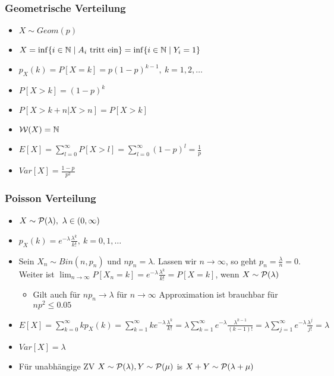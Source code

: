 \subsubsection{Geometrische Verteilung}
\begin{itemize}
    \item $X \sim Geom(p)$
    \item $X = \inf \{i \in \mathbb{N} \mid A_i \text{ tritt ein}\} = \inf \{i \in \mathbb{N} \mid Y_i = 1\}$
    \item $p_X(k) = P[X = k] = p(1 - p)^{k - 1}, \ k = 1, 2, \dots$
    \item $P[X > k] = (1 - p)^k$
    \item $P[X > k + n | X > n] = P[X > k]$
    \item $\mathcal{W}(X) = \mathbb{N}$
    \item $E[X] = \sum_{l=0}^{\infty} P[X > l] = \sum_{l=0}^{\infty} (1 - p)^l = \frac{1}{p}$
    \item $Var[X] = \frac{1 - p}{p^2}$
\end{itemize}

\subsubsection{Poisson Verteilung}
\begin{itemize}
    \item $X \sim \mathcal{P}(\lambda), \ \lambda \in (0, \infty)$
    \item $p_X(k) = e^{-\lambda} \frac{\lambda^k}{k!}, \ k = 0, 1, \dots$
    \item Sein $X_n \sim Bin(n, p_n)$ und $np_n = \lambda$. Lassen wir $n \to \infty$, so geht $p_n = \frac{\lambda}{n} = 0$. Weiter ist $\lim_{n \to \infty} P[X_n = k] = e^{-\lambda} \frac{\lambda^k}{k!} = P[X = k]$, wenn $X \sim \mathcal{P}(\lambda)$
        \begin{itemize}
            \item Gilt auch für $np_n \to \lambda$ für $n \to \infty$
             Approximation ist brauchbar für $np^2 \le 0.05$
        \end{itemize}
    \item $E[X] = \sum_{k=0}^{\infty} kp_X(k) = \sum_{k=1}^{\infty} ke^{-\lambda} \frac{\lambda^k}{k!} = \lambda \sum_{k=1}^{\infty} e^{-\lambda} \frac{\lambda^{k - 1}}{(k - 1)!} = \lambda \sum_{j=1}^{\infty} e^{-\lambda} \frac{\lambda^j}{j!} = \lambda$
    \item $Var[X] = \lambda$
    \item Für unabhängige ZV $X \sim \mathcal{P}(\lambda), Y \sim \mathcal{P}(\mu)$ is $X + Y \sim \mathcal{P}(\lambda + \mu)$
\end{itemize}
